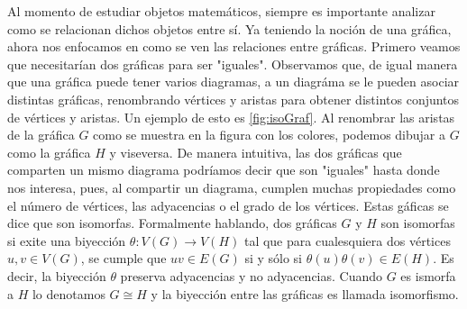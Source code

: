 Al momento de estudiar objetos matem\'aticos, siempre es importante analizar
como se relacionan dichos objetos entre s\'i. Ya teniendo la noci\'on de una
gr\'afica, ahora nos enfocamos en como se ven las relaciones entre gr\'aficas.
Primero veamos que necesitar\'ian dos gr\'aficas para ser "iguales". Observamos
que, de igual manera que una gr\'afica puede tener varios diagramas, a un
diagr\'ama se le pueden asociar distintas gr\'aficas, renombrando v\'ertices y
aristas para obtener distintos conjuntos de v\'ertices y aristas. Un ejemplo de
esto es \cref{fig:isoGraf}. Al renombrar las aristas de la gr\'afica $G$ como se
muestra en la figura con los colores, podemos dibujar a $G$ como la gr\'afica
$H$ y viseversa. De manera intuitiva, las dos gr\'aficas que comparten un mismo
diagrama podr\'iamos decir que son "iguales" hasta donde nos interesa, pues, al
compartir un diagrama, cumplen muchas propiedades como el n\'umero de
v\'ertices, las adyacencias o el grado de los v\'ertices. Estas g\'aficas se
dice que son isomorfas. Formalmente hablando, dos gr\'aficas $G$ y $H$ son
isomorfas si exite una biyecci\'on $\theta: V(G) \rightarrow V(H)$ tal que para
cualesquiera dos v\'ertices $u, v \in V(G)$, se cumple que $uv \in E(G)$ si y
s\'olo si $\theta(u)\theta(v) \in E(H)$. Es decir, la biyecci\'on $\theta$
preserva adyacencias y no adyacencias. Cuando $G$ es ismorfa a $H$ lo denotamos
$G \cong H$ y la biyecci\'on entre las gr\'aficas es llamada isomorfismo.

